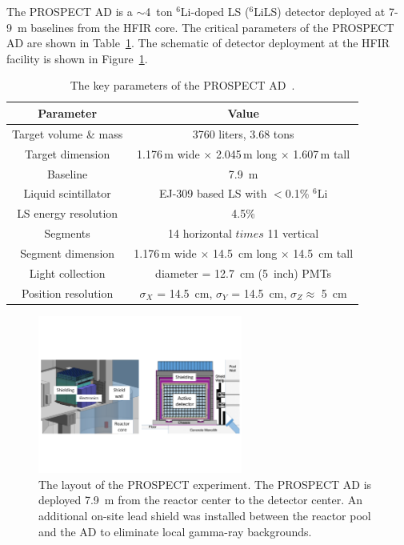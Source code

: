     The PROSPECT AD is a $\sim$4~ton $^{6}$Li-doped LS ($^{6}$LiLS) detector deployed at 7-9~m baselines from the HFIR core.
    The critical parameters of the PROSPECT AD are shown in Table~\ref{tab:PROSPECT_AD}.
    The schematic of detector deployment at the HFIR facility is shown in Figure~\ref{fig:PROSPECT_LAYOUT}.
\begin{table}[h]
    \centering
    \caption[Key parameters of the PROSPECT AD]{The key parameters of the PROSPECT AD~\cite{bib:prospect_nim}.}
    \begin{tabular}{cc}
    \hline
    \hline
    Parameter  & Value   \\ 
    \hline
    Target volume \& mass    & 3760 liters, 3.68 tons\\
    Target dimension & 1.176\,m wide $\times$ 2.045\,m long  $\times$ 1.607\,m tall \\
    Baseline     & 7.9~m \\
    Liquid scintillator & EJ-309 based LS with $<$0.1\% $^{6}$Li \\
    LS energy resolution & 4.5\% \\
    Segments & 14 horizontal $times$ 11 vertical \\
    Segment dimension & 1.176\,m wide $\times$ 14.5~cm long  $\times$ 14.5~cm tall \\
    Light collection & diameter = 12.7~cm (5~inch) PMTs\\
    Position resolution & $\sigma_X$ = 14.5~cm,  $\sigma_Y$ = 14.5~cm,  $\sigma_Z \approx$ 5~cm \\
    \hline
    \end{tabular}
    \label{tab:PROSPECT_AD}
\end{table}
\begin{figure}
    \centering
    \includegraphics[width=0.6\textwidth]{Figures/Layout.pdf}
    \caption[The layout of the PROSPECT experiment]{The layout of the PROSPECT experiment.
    The PROSPECT AD is deployed 7.9~m from the reactor center to the detector center.
    An additional on-site lead shield was installed between the reactor pool and the AD to eliminate local gamma-ray backgrounds.
    }
    \label{fig:PROSPECT_LAYOUT}
\end{figure}
    
